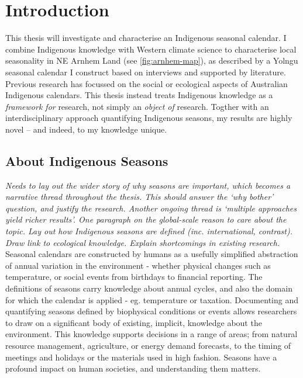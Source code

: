 \chapter{Introduction}

This thesis will investigate and characterise an Indigenous seasonal calendar.
I combine Indigenous knowledge with Western climate science to characterise
local seasonality in NE Arnhem Land (see \autoref{fig:arnhem-map}),
as described by a Yolngu seasonal calendar I construct based on
interviews and supported by literature.\\

Previous research has focussed on the social or ecological aspects of Australian
Indigenous calendars.  This thesis instead treats Indigenous knowledge as a
\emph{framework for} research, not simply an \emph{object of} research.
Togther with an interdisciplinary approach quantifying Indigenous seasons,
my results are highly novel -- and indeed, to my knowledge unique.



\section{About Indigenous Seasons}
\textit{
Needs to lay out the wider story of why seasons are important,
which becomes a narrative thread throughout the thesis.
This should answer the `why bother' question, and justify the research.
Another ongoing thread is `multiple approaches yield richer results'.
%
One paragraph on the global-scale reason to care about the topic.
Lay out how Indigenous seasons are defined (inc. international, contrast).
Draw link to ecological knowledge.
Explain shortcomings in existing research.
}
~\\


Seasonal calendars are constructed by humans as a usefully simplified
abstraction of annual variation in the environment - whether physical
changes such as temperature, or social events from birthdays to financial
reporting.  The definitions of seasons carry knowledge about annual cycles,
and also the domain for which the calendar is applied - eg. temperature
or taxation.
%
Documenting and quantifying seasons defined by biophysical conditions
or events allows researchers to draw on a significant body of existing,
implicit, knowledge about the environment.
%
This knowledge supports decisions in a range of areas; from natural
resource management, agriculture, or energy demand forecasts, to
the timing of meetings and holidays or the materials used in high fashion.
Seasons have a profound impact on human societies, and understanding
them matters.\\


